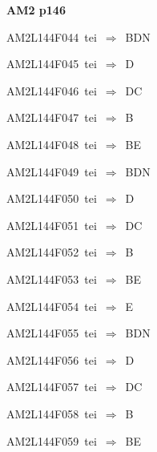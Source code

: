 \par\vfill\eject
{\bf\hfill AM2 p146\hfill\hbox{}}\par\bigskip
{\sixrm AM2L144F044\ {\sixit tei}\ }$\Rightarrow$\ BDN\par\smallskip
{\sixrm AM2L144F045\ {\sixit tei}\ }$\Rightarrow$\ D\par\smallskip
{\sixrm AM2L144F046\ {\sixit tei}\ }$\Rightarrow$\ DC\par\smallskip
{\sixrm AM2L144F047\ {\sixit tei}\ }$\Rightarrow$\ B\par\smallskip
{\sixrm AM2L144F048\ {\sixit tei}\ }$\Rightarrow$\ BE\par\smallskip
{\sixrm AM2L144F049\ {\sixit tei}\ }$\Rightarrow$\ BDN\par\smallskip
{\sixrm AM2L144F050\ {\sixit tei}\ }$\Rightarrow$\ D\par\smallskip
{\sixrm AM2L144F051\ {\sixit tei}\ }$\Rightarrow$\ DC\par\smallskip
{\sixrm AM2L144F052\ {\sixit tei}\ }$\Rightarrow$\ B\par\smallskip
{\sixrm AM2L144F053\ {\sixit tei}\ }$\Rightarrow$\ BE\par\smallskip
{\sixrm AM2L144F054\ {\sixit tei}\ }$\Rightarrow$\ E\par\smallskip
{\sixrm AM2L144F055\ {\sixit tei}\ }$\Rightarrow$\ BDN\par\smallskip
{\sixrm AM2L144F056\ {\sixit tei}\ }$\Rightarrow$\ D\par\smallskip
{\sixrm AM2L144F057\ {\sixit tei}\ }$\Rightarrow$\ DC\par\smallskip
{\sixrm AM2L144F058\ {\sixit tei}\ }$\Rightarrow$\ B\par\smallskip
{\sixrm AM2L144F059\ {\sixit tei}\ }$\Rightarrow$\ BE\par\smallskip

